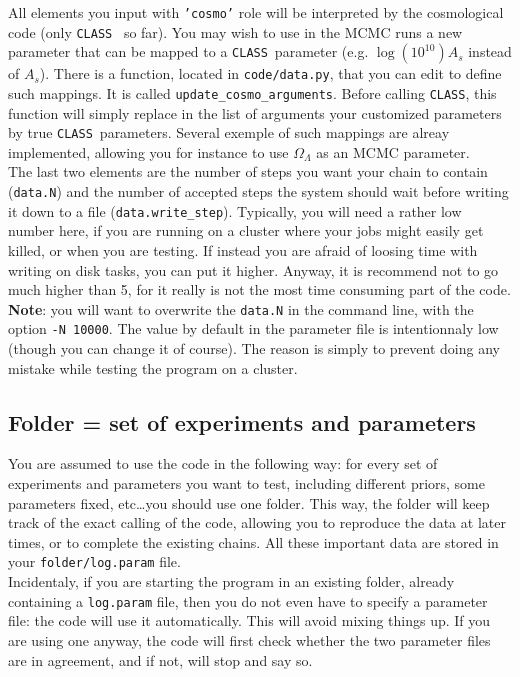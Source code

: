 \documentclass[10pt]{article}
\newcommand{\CLASS}{\texttt{CLASS}}
\begin{document}
  All elements you input with {\tt 'cosmo'} role will
  be interpreted by the cosmological code (only
  \CLASS~ so far). You may wish to use in the MCMC runs a new parameter that can be mapped to a \CLASS~parameter (e.g. $\log(10^{10})A_s$ instead of $A_s$). There is a function, located in \verb?code/data.py?, that you can edit to define such mappings. It is called  \verb?update_cosmo_arguments?. Before calling \CLASS, this function will simply replace in the list of arguments your customized parameters by true \CLASS~parameters. Several exemple of such mappings are
  alreay implemented, allowing you for instance to use $\Omega_{\Lambda}$ as an MCMC parameter.\\

  The last two elements are the number of steps you want your chain to contain
  (\verb?data.N?) and the number of accepted steps the system should wait
  before writing it down to a file (\verb?data.write_step?). Typically, you
  will need a rather low number here, if you are running on a cluster where
  your jobs might easily get killed, or when you are testing. If instead you
  are afraid of loosing time with writing on disk tasks, you can put it higher.
  Anyway, it is recommend not to go much higher than 5, for it really is not
  the most time consuming part of the code.\\

  {\bf Note}: you will want to overwrite the \verb?data.N? in the command line,
  with the option \verb?-N 10000?. The value by default in the parameter file
  is intentionnaly low (though you can change it of course). The reason is
  simply to prevent doing any mistake while testing the program on a cluster.

  \subsection{Folder = set of experiments and parameters}
  
  You are assumed to use the code in the following way: for every set of
  experiments and parameters you want to test, including different priors, some
  parameters fixed, etc\ldots you should use one folder. This way, the folder
  will keep track of the exact calling of the code, allowing you to reproduce
  the data at later times, or to complete the existing chains. All these
  important data are stored in your \verb?folder/log.param? file.\\

  Incidentaly, if you are starting the program in an existing folder, already
  containing a \verb?log.param? file, then you do not even have to specify a
  parameter file: the code will use it automatically. This will avoid mixing
  things up. If you are using one anyway, the code will first check whether the
  two parameter files are in agreement, and if not, will stop and say so.\\
\end{document}

